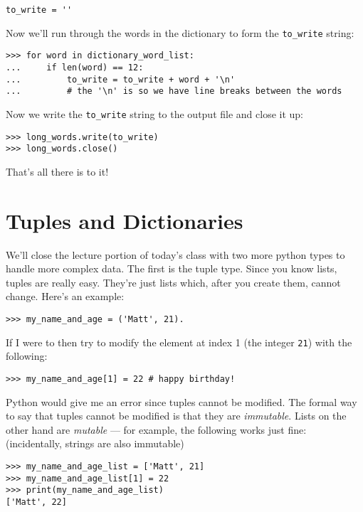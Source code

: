 \begin{lstlisting}[numbers=none]
to_write = ''
\end{lstlisting}

Now we'll run through the words in the dictionary to form the \texttt{to\_write} string:

\begin{lstlisting}[numbers=none]
>>> for word in dictionary_word_list:
...	    if len(word) == 12:
...	        to_write = to_write + word + '\n' 
...	        # the '\n' is so we have line breaks between the words
\end{lstlisting}

Now we write the \texttt{to\_write} string to the output file and close it up:

\begin{lstlisting}[numbers=none]
>>> long_words.write(to_write)
>>> long_words.close()
\end{lstlisting}

That's all there is to it!


\section*{Tuples and Dictionaries}

We'll close the lecture portion of today's class with two more python types to handle more complex data. The first is the tuple type. Since you know lists, tuples are really easy. They're just lists which, after you create them, cannot change. Here's an example:

\begin{lstlisting}[numbers=none]
>>> my_name_and_age = ('Matt', 21). 
\end{lstlisting}

If I were to then try to modify the element at index 1 (the integer \texttt{21}) with the following:

\begin{lstlisting}[numbers=none]
>>> my_name_and_age[1] = 22 # happy birthday!
\end{lstlisting}

Python would give me an error since tuples cannot be modified. The formal way to say that tuples cannot be modified is that they are \emph{immutable}. Lists on the other hand are \emph{mutable} --- for example, the following works just fine: (incidentally, strings are also immutable)

\begin{lstlisting}[numbers=none]
>>> my_name_and_age_list = ['Matt', 21]
>>> my_name_and_age_list[1] = 22
>>> print(my_name_and_age_list)
['Matt', 22]
\end{lstlisting}

